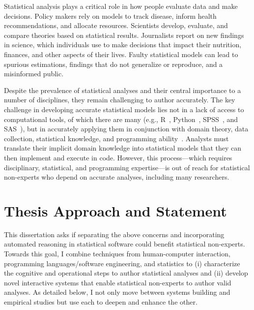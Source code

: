 

Statistical analysis plays a critical role in how people evaluate data and make
decisions. Policy makers rely on models to track disease, inform health
recommendations, and allocate resources. Scientists develop, evaluate, and
compare theories based on statistical results. Journalists report on new
findings in science, which individuals use to make decisions that impact their
nutrition, finances, and other aspects of their lives. Faulty statistical models
can lead to spurious estimations, findings that do not generalize or reproduce,
and a misinformed public. 

Despite the prevalence of statistical analyses and their central importance to a
number of disciplines, they remain challenging to author accurately. The key
challenge in developing accurate statistical models lies not in a lack of access
to computational tools, of which there are many (e.g., R~\cite{team2013r},
Python~\cite{sanner1999python}, SPSS~\cite{spss}, and SAS~\cite{sas}), but in
accurately applying them in conjunction with domain theory, data collection,
statistical knowledge, and programming ability~\cite{mcelreath2020statistical}.
Analysts must translate their implicit domain knowledge into statistical models
that they can then implement and execute in code. However, this process---which
requires disciplinary, statistical, and programming expertise---is out of reach
for statistical non-experts who depend on accurate analyses, including many
researchers. 


\section{Thesis Approach and Statement}
This dissertation asks if separating the above concerns and incorporating
automated reasoning in statistical software could benefit statistical
non-experts. Towards this goal, I combine techniques from human-computer
interaction, programming languages/software engineering, and statistics to (i)
characterize the cognitive and operational steps to author statistical analyses
and (ii) develop novel interactive systems that enable statistical non-experts
to author valid analyses. As detailed below, I not only move between systems
building and empirical studies but use each to deepen and enhance the other.

